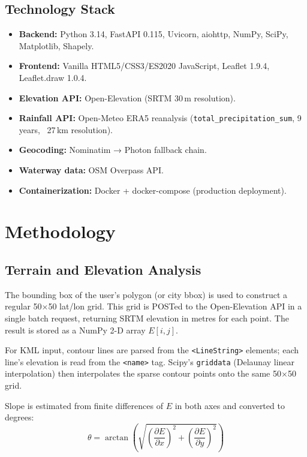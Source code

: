 \documentclass[manuscript,screen,review]{acmart}
\begin{document}
\subsection{Technology Stack}

\begin{itemize}
  \item \textbf{Backend:} Python 3.14, FastAPI 0.115, Uvicorn, aiohttp, NumPy, SciPy, Matplotlib, Shapely.
  \item \textbf{Frontend:} Vanilla HTML5/CSS3/ES2020 JavaScript, Leaflet 1.9.4, Leaflet.draw 1.0.4.
  \item \textbf{Elevation API:} Open-Elevation (SRTM 30\,m resolution).
  \item \textbf{Rainfall API:} Open-Meteo ERA5 reanalysis (\texttt{total\_precipitation\_sum}, 9 years, ~27\,km resolution).
  \item \textbf{Geocoding:} Nominatim → Photon fallback chain.
  \item \textbf{Waterway data:} OSM Overpass API.
  \item \textbf{Containerization:} Docker + docker-compose (production deployment).
\end{itemize}

\section{Methodology}
\label{sec:methodology}

\subsection{Terrain and Elevation Analysis}

The bounding box of the user's polygon (or city bbox) is used to
construct a regular 50$\times$50 lat/lon grid. This grid is POSTed to
the Open-Elevation API in a single batch request, returning SRTM
elevation in metres for each point. The result is stored as a NumPy
2-D array $E[i,j]$.

For KML input, contour lines are parsed from the \texttt{<LineString>}
elements; each line's elevation is read from the \texttt{<name>}
tag. Scipy's \texttt{griddata} (Delaunay linear interpolation)
then interpolates the sparse contour points onto the same 50$\times$50
grid.

Slope is estimated from finite differences of $E$ in both axes
and converted to degrees:
\[
  \theta = \arctan\!\left(\sqrt{\left(\frac{\partial E}{\partial x}\right)^2
    + \left(\frac{\partial E}{\partial y}\right)^2}\right)
\]
\end{document}
